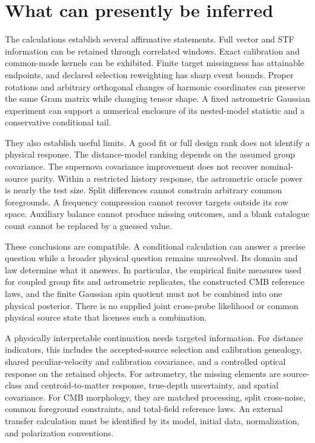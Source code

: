 \section{What can presently be inferred}
\label{sec:synthesis}

The calculations establish several affirmative statements. Full vector and STF information can be retained through correlated windows. Exact calibration and common-mode kernels can be exhibited. Finite target missingness has attainable endpoints, and declared selection reweighting has sharp event bounds. Proper rotations and arbitrary orthogonal changes of harmonic coordinates can preserve the same Gram matrix while changing tensor shape. A fixed astrometric Gaussian experiment can support a numerical enclosure of its nested-model statistic and a conservative conditional tail.

They also establish useful limits. A good fit or full design rank does not identify a physical response. The distance-model ranking depends on the assumed group covariance. The supernova covariance improvement does not recover nominal-source parity. Within a restricted history response, the astrometric oracle power is nearly the test size. Split differences cannot constrain arbitrary common foregrounds. A frequency compression cannot recover targets outside its row space. Auxiliary balance cannot produce missing outcomes, and a blank catalogue count cannot be replaced by a guessed value.

These conclusions are compatible. A conditional calculation can answer a precise question while a broader physical question remains unresolved. Its domain and law determine what it answers. In particular, the empirical finite measures used for coupled group fits and astrometric replicates, the constructed CMB reference laws, and the finite Gaussian spin quotient must not be combined into one physical posterior. There is no supplied joint cross-probe likelihood or common physical source state that licenses such a combination.

A physically interpretable continuation needs targeted information. For distance indicators, this includes the accepted-source selection and calibration genealogy, shared peculiar-velocity and calibration covariance, and a controlled optical response on the retained objects. For astrometry, the missing elements are source-class and centroid-to-matter response, true-depth uncertainty, and spatial covariance. For CMB morphology, they are matched processing, split cross-noise, common foreground constraints, and total-field reference laws. An external transfer calculation must be identified by its model, initial data, normalization, and polarization conventions.

